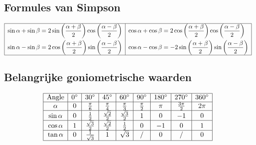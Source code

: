 \documentclass[a5paper]{article}
\begin{document}
{\subsection{Formules van Simpson}
\[
\begin{array}{|c|c|}
\hline
\begin{aligned}
\sin \alpha + \sin \beta &= 2\sin\left(\frac{\alpha + \beta}{2}\right)\cos\left(\frac{\alpha - \beta}{2}\right) \\
\sin \alpha - \sin \beta &= 2\cos\left(\frac{\alpha + \beta}{2}\right)\sin\left(\frac{\alpha - \beta}{2}\right)
\end{aligned} & 
\begin{aligned}
\cos \alpha + \cos \beta &= 2\cos\left(\frac{\alpha + \beta}{2}\right)\cos\left(\frac{\alpha - \beta}{2}\right) \\
\cos \alpha - \cos \beta &= -2\sin\left(\frac{\alpha + \beta}{2}\right)\sin\left(\frac{\alpha - \beta}{2}\right)
\end{aligned} \\
\hline
\end{array}
\]

\newpage
\subsection{Belangrijke goniometrische waarden}
\[
\begin{array}{|c|c|c|c|c|c|c|c|c|c|}
\hline
\text{Angle} & 0^\circ & 30^\circ & 45^\circ & 60^\circ & 90^\circ & 180^\circ & 270^\circ & 360^\circ \\
\hline
\alpha & 0 & \frac{\pi}{6} & \frac{\pi}{4} & \frac{\pi}{3} & \frac{\pi}{2} & \pi & \frac{3\pi}{2} & 2\pi \\
\hline
\sin \alpha & 0 & \frac{1}{2} & \frac{\sqrt{2}}{2} & \frac{\sqrt{3}}{2} & 1 & 0 & -1 & 0 \\
\hline
\cos \alpha & 1 & \frac{\sqrt{3}}{2} & \frac{\sqrt{2}}{2} & \frac{1}{2} & 0 & -1 & 0 & 1 \\
\hline
\tan \alpha & 0 & \frac{1}{\sqrt{3}} & 1 & \sqrt{3} & / & 0 & / & 0 \\
\hline
\end{array}
\]

}
\end{document}
